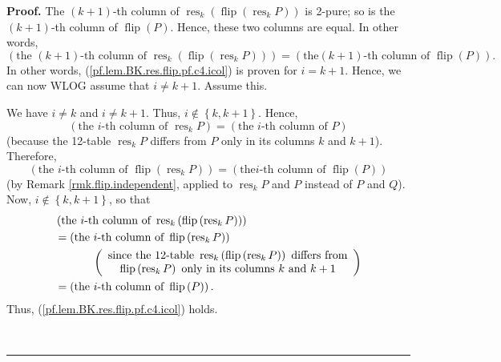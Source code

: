 \documentclass[numbers=enddot,12pt,final,onecolumn,notitlepage]{scrartcl}%
\theoremstyle{definition}
\newenvironment{proof}[1][Proof]{\noindent\textbf{#1.} }{\ \rule{0.5em}{0.5em}}
\newenvironment{verlong}{}{}
\begin{document}
\begin{verlong}
\begin{proof}
The $\left(  k+1\right)  $-th column of $\operatorname*{res}\nolimits_{k}%
\left(  \operatorname*{flip}\left(  \operatorname*{res}\nolimits_{k}P\right)
\right)  $ is 2-pure; so is the $\left(  k+1\right)  $-th column of
$\operatorname*{flip}\left(  P\right)  $. Hence, these two columns are equal.
In other words,%
\[
\left(  \text{the }\left(  k+1\right)  \text{-th column of }%
\operatorname*{res}\nolimits_{k}\left(  \operatorname*{flip}\left(
\operatorname*{res}\nolimits_{k}P\right)  \right)  \right)  =\left(  \text{the
}\left(  k+1\right)  \text{-th column of }\operatorname*{flip}\left(
P\right)  \right)  .
\]
In other words, (\ref{pf.lem.BK.res.flip.pf.c4.icol}) is proven for $i=k+1$.
Hence, we can now WLOG assume that $i\neq k+1$. Assume this.

We have $i\neq k$ and $i\neq k+1$. Thus, $i\notin\left\{  k,k+1\right\}  $.
Hence,%
\[
\left(  \text{the }i\text{-th column of }\operatorname*{res}\nolimits_{k}%
P\right)  =\left(  \text{the }i\text{-th column of }P\right)
\]
(because the 12-table $\operatorname*{res}\nolimits_{k}P$ differs from $P$
only in its columns $k$ and $k+1$). Therefore,%
\[
\left(  \text{the }i\text{-th column of }\operatorname*{flip}\left(
\operatorname*{res}\nolimits_{k}P\right)  \right)  =\left(  \text{the
}i\text{-th column of }\operatorname*{flip}\left(  P\right)  \right)
\]
(by Remark \ref{rmk.flip.independent}, applied to $\operatorname*{res}%
\nolimits_{k}P$ and $P$ instead of $P$ and $Q$). Now, $i\notin\left\{
k,k+1\right\}  $, so that%
\begin{align*}
&  \left(  \text{the }i\text{-th column of }\operatorname*{res}\nolimits_{k}%
\left(  \operatorname*{flip}\left(  \operatorname*{res}\nolimits_{k}P\right)
\right)  \right) \\
&  =\left(  \text{the }i\text{-th column of }\operatorname*{flip}\left(
\operatorname*{res}\nolimits_{k}P\right)  \right) \\
&  \ \ \ \ \ \ \ \ \ \ \left(
\begin{array}
[c]{c}%
\text{since the 12-table }\operatorname*{res}\nolimits_{k}\left(
\operatorname*{flip}\left(  \operatorname*{res}\nolimits_{k}P\right)  \right)
\text{ differs from}\\
\operatorname*{flip}\left(  \operatorname*{res}\nolimits_{k}P\right)  \text{
only in its columns }k\text{ and }k+1
\end{array}
\right) \\
&  =\left(  \text{the }i\text{-th column of }\operatorname*{flip}\left(
P\right)  \right)  .
\end{align*}
Thus, (\ref{pf.lem.BK.res.flip.pf.c4.icol}) holds.


\end{proof}
\end{verlong}
\end{document}
